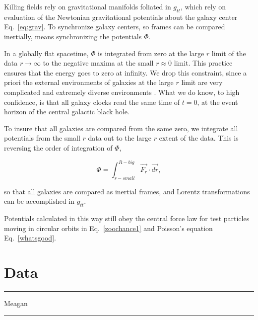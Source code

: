 \documentclass[reprint,%
 amsmath,amssymb,
 aps,
]{revtex4-1}
\begin{document}
     Killing fields rely on  gravitational manifolds foliated in
  $g_{tt}$, 
  which   rely on evaluation of the Newtonian  gravitational potentials about the galaxy center Eq.~\ref{eq:grav}. To synchronize    galaxy centers, so      frames can   be compared inertially, means synchronizing the potentials   $\Phi $. 
   
   
 In a globally flat spacetime, $\Phi$ is integrated from zero at the large $r$ limit of the data  $r \to \infty$ to the negative maxima at the  small $r\approx 0$ limit. This practice ensures that the energy goes to zero at infinity. 
  We drop this constraint, since a priori the external environments of galaxies at the large $r$  limit are very complicated and   extremely   diverse environments \cite{Pomarede:2020pme,Hoffman:2017ako}.  What we do know, to high confidence,     is that all galaxy clocks read the same time of $t=0$, at the event horizon of the central  galactic black hole. 
  
 To insure that all galaxies are compared from the same zero, we integrate all potentials from the  small $r$ data out  to the large $r$  extent of the data.     This  is  reversing the 
    order of integration of $\Phi$,   

 \begin{equation}
     \Phi  =   \int^{R-big}_{r-small} \vec{F_r}\cdot\vec{dr} ,
      \label{eq:Newt2}
      \end{equation}
 
  so that all galaxies are compared as inertial frames, and Lorentz transformations can be accomplished in $g_{tt}$.
  
   Potentials calculated in this way still obey the central force law for test particles moving in circular orbits in Eq.~\ref{zoochance1} and Poisson's equation Eq.~\ref{whatsgood}.
   
 


\section{Data \label{sec:data}}

{\color{teal} \rule{\linewidth}{0.5mm}}
 {\color{teal}  Meagan  }
{\color{teal} \rule{\linewidth}{0.5mm}}
\end{document}
